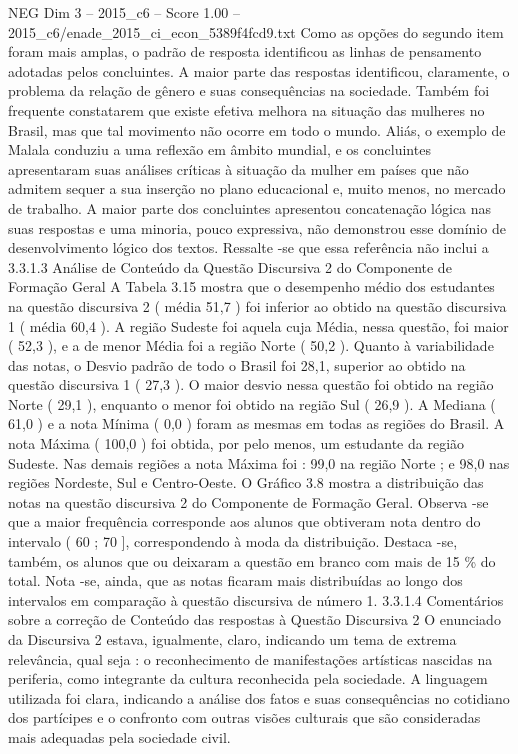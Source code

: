 \begin{textsample}{NEG Dim 3 – 2015\_c6 – Score 1.00 – 2015\_c6/enade\_2015\_ci\_econ\_5389f4fcd9.txt}
Como as opções do segundo item foram mais amplas, o padrão de resposta identificou as linhas de pensamento adotadas pelos concluintes.
A maior parte das respostas identificou, claramente, o problema da relação de gênero e suas consequências na sociedade.
Também foi frequente constatarem que existe efetiva melhora na situação das mulheres no Brasil, mas que tal movimento não ocorre em todo o mundo.
Aliás, o exemplo de Malala conduziu a uma reflexão em âmbito mundial, e os concluintes apresentaram suas análises críticas à situação da mulher em países que não admitem sequer a sua inserção no plano educacional e, muito menos, no mercado de trabalho.
A maior parte dos concluintes apresentou concatenação lógica nas suas respostas e uma minoria, pouco expressiva, não demonstrou esse domínio de desenvolvimento lógico dos textos.
Ressalte -se que essa referência não inclui a 3.3.1.3 Análise de Conteúdo da Questão Discursiva 2 do Componente de Formação Geral A Tabela 3.15 mostra que o desempenho médio dos estudantes na questão discursiva 2 ( média 51,7 ) foi inferior ao obtido na questão discursiva 1 ( média 60,4 ).
A região Sudeste foi aquela cuja Média, nessa questão, foi maior ( 52,3 ), e a de menor Média foi a região Norte ( 50,2 ).
Quanto à variabilidade das notas, o Desvio padrão de todo o Brasil foi 28,1, superior ao obtido na questão discursiva 1 ( 27,3 ).
O maior desvio nessa questão foi obtido na região Norte ( 29,1 ), enquanto o menor foi obtido na região Sul ( 26,9 ).
A Mediana ( 61,0 ) e a nota Mínima ( 0,0 ) foram as mesmas em todas as regiões do Brasil.
A nota Máxima ( 100,0 ) foi obtida, por pelo menos, um estudante da região Sudeste.
Nas demais regiões a nota Máxima foi : 99,0 na região Norte ; e 98,0 nas regiões Nordeste, Sul e Centro-Oeste.
O Gráfico 3.8 mostra a distribuição das notas na questão discursiva 2 do Componente de Formação Geral.
Observa -se que a maior frequência corresponde aos alunos que obtiveram nota dentro do intervalo ( 60 ; 70 ], correspondendo à moda da distribuição.
Destaca -se, também, os alunos que ou deixaram a questão em branco com mais de 15 \% do total.
Nota -se, ainda, que as notas ficaram mais distribuídas ao longo dos intervalos em comparação à questão discursiva de número 1. 3.3.1.4 Comentários sobre a correção de Conteúdo das respostas à Questão Discursiva 2 O enunciado da Discursiva 2 estava, igualmente, claro, indicando um tema de extrema relevância, qual seja : o reconhecimento de manifestações artísticas nascidas na periferia, como integrante da cultura reconhecida pela sociedade.
A linguagem utilizada foi clara, indicando a análise dos fatos e suas consequências no cotidiano dos partícipes e o confronto com outras visões culturais que são consideradas mais adequadas pela sociedade civil.

\end{textsample}
